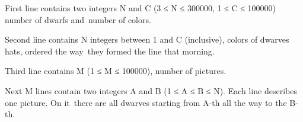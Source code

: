 First line contains two integers N and C (3 ≤ N ≤ 300000, 1 ≤ C ≤ 100000) number of dwarfs and number of colors.  

   Second line contains N integers between 1 and C (inclusive), colors of dwarves hats, ordered the way they formed the line that morning.  

   Third line contains M (1 ≤ M ≤ 100000), number of pictures.  

   Next M lines contain two integers A and B (1 ≤ A ≤ B ≤ N). Each line describes one picture. On it there are all dwarves starting from A-th all the way to the B-th.